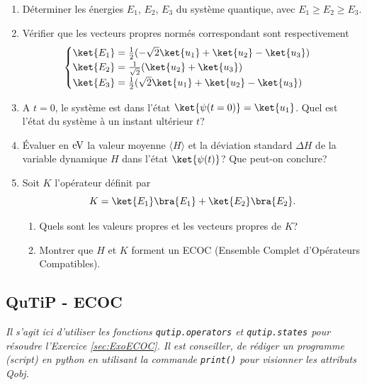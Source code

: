 \begin{enumerate}
\item Déterminer les énergies $E_1$, $E_{2}$, $E_3$ du système quantique,
avec $E_1\geq E_{2}\geq E_3$.

\item Vérifier que les vecteurs propres normés correspondant sont
respectivement%
\begin{equation}
\begin{cases}
\ket{E_1}=\frac{1}{2}(-\sqrt{2}\ket{u_1} +\ket{u_{2}}-\ket{u_3}) \\
\ket{E_{2}}=\frac{1}{\sqrt{2}}(\ket{u_{2}}+\ket{u_3}) \\
\ket{E_3}=\frac{1}{2}(\sqrt{2}\ket{u_1} +\ket{u_{2}}-\ket{u_3})
\end{cases}
\end{equation}

\item A $t=0$, le système est dans l'état $\ket{\psi(t=0)}=\ket{u_1}$. Quel
est l'état du système à un instant ultérieur $t$?

\item Évaluer en $\operatorname{eV}$ la valeur moyenne $\langle H\rangle$ et la
déviation standard $\Delta H$ de la variable dynamique $H$ dans l'état
$\ket{\psi(t)}$? Que peut-on conclure?

\item Soit $K$ l'opérateur définit par%
\begin{equation}
K=\ket{E_1}\bra{E_1} +\ket{E_{2}}\bra{E_{2}}.
\end{equation}

\begin{enumerate}
\item Quels sont les valeurs propres et les vecteurs propres de $K$?

\item Montrer que $H$ et $K$ forment un ECOC (Ensemble Complet d'Opérateurs
Compatibles).
\end{enumerate}
\end{enumerate}

\subsection{QuTiP - ECOC}

\emph{Il s'agit ici d'utiliser les fonctions \texttt{qutip.operators} et 
\texttt{qutip.states} pour résoudre l'Exercice \ref{sec:ExoECOC}. Il est  
conseiller, de rédiger un programme (script) en python en utilisant la commande 
\texttt{print()} pour visionner les attributs Qobj.}

